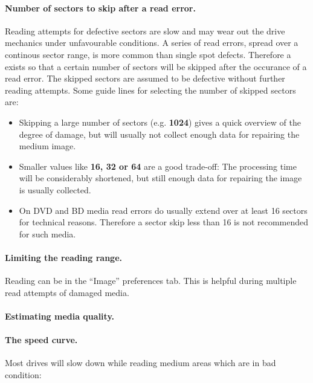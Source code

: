 \medskip

\paragraph{Number of sectors to skip after a read error.} Reading
attempts for defective sectors are slow and may wear out the drive
mechanics under unfavourable conditions. A series of read errors,
spread over a continous sector range, is more common than single spot defects.
Therefore a  exists
so that a certain number of sectors
will be skipped after the occurance of a read error. The skipped sectors are
assumed to be defective without further reading attempts. Some guide lines for
selecting the number of skipped sectors are:

\begin{itemize}
\item Skipping a large number of sectors (e.g. {\bf 1024}) gives a quick
  overview of the degree of damage, but will usually not collect enough
  data for repairing the medium image.
\item Smaller values like {\bf 16, 32 or 64} are a good trade-off: The processing
  time will be considerably shortened, but still enough data for repairing
  the image is usually collected.
\item On DVD and BD  media read errors do usually extend over at least 16 sectors
  for technical reasons. Therefore a sector skip less than 16 is not recommended
  for such  media.
\end{itemize}

\paragraph{Limiting the reading range.}

\medskip

Reading can
be  in
the ``Image'' preferences tab. This is helpful during
multiple read attempts of damaged media. 

\paragraph{Estimating media quality.}\quad

\medskip

\paragraph{The speed curve.} Most drives
will slow down while reading medium areas which are in bad condition:


